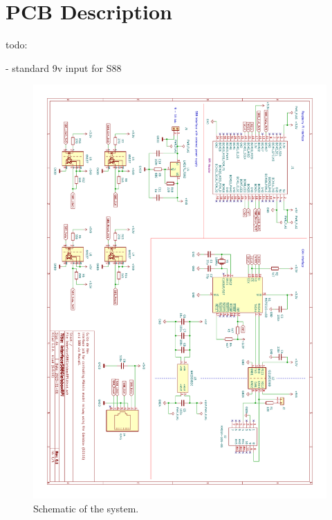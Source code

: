 \section{PCB Description}

todo:

- standard 9v input for S88

\begin{figure}[h!]
	\centering
	\includegraphics[width=1.00\linewidth]{../../pcb/InterfaceS88GleisboxRPi/InterfaceS88GleisboxRPi.pdf}
	\caption{Schematic of the system.}
	\label{fig:pcbschematic}
\end{figure}